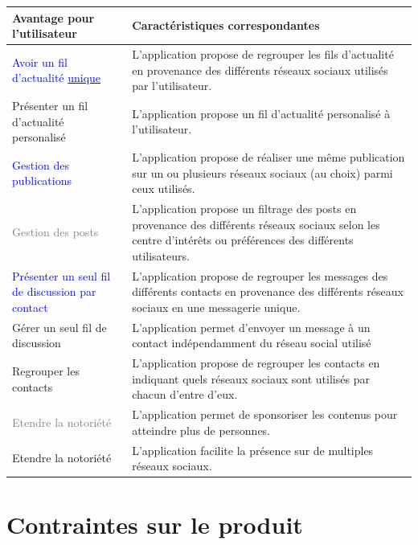 \documentclass[11pt]{article}
\begin{document}
\begin{center}
	\begin{tabular}{|L{.25\textwidth}|L{.7\textwidth}|}
		\hline
		\textbf{Avantage pour l’utilisateur} & \textbf{Caractéristiques correspondantes} \\
		\hline
		\textcolor{blue}{Avoir un fil d'actualité \underline{unique}} & L’application propose de regrouper les fils d’actualité en provenance des différents réseaux sociaux utilisés par l’utilisateur. \\
		\hline
		Présenter un fil d’actualité personalisé & L’application propose un fil d’actualité personalisé à l’utilisateur. \\
		\hline
		\textcolor{blue}{Gestion des publications} & L’application propose de réaliser une même publication sur un ou plusieurs réseaux sociaux (au choix) parmi ceux utilisés. \\
		\hline
		\textcolor{gray}{Gestion des posts} & L’application propose un filtrage des posts en provenance des différents réseaux sociaux selon les centre d’intérêts ou préférences des différents utilisateurs. \\
		\hline
		\textcolor{blue}{Présenter un seul fil de discussion par contact} & L’application propose de regrouper les messages des différents contacts en provenance des différents réseaux sociaux en une messagerie unique. \\
		\hline
		Gérer un seul fil de discussion & L’application permet d’envoyer un message à un contact indépendamment du réseau social utilisé \\
		\hline
		Regrouper les contacts & L’application propose de regrouper les contacts en indiquant quels réseaux sociaux sont utilisés par chacun d’entre d’eux. \\
		\hline
		\textcolor{gray}{Etendre la notoriété} & L’application permet de sponsoriser les contenus pour atteindre plus de personnes. \\
		\hline
		Etendre la notoriété & L’application facilite la présence sur de multiples réseaux sociaux. \\
		\hline
	\end{tabular}
\end{center}


\newpage
\section{Contraintes sur le produit}
\end{document}
